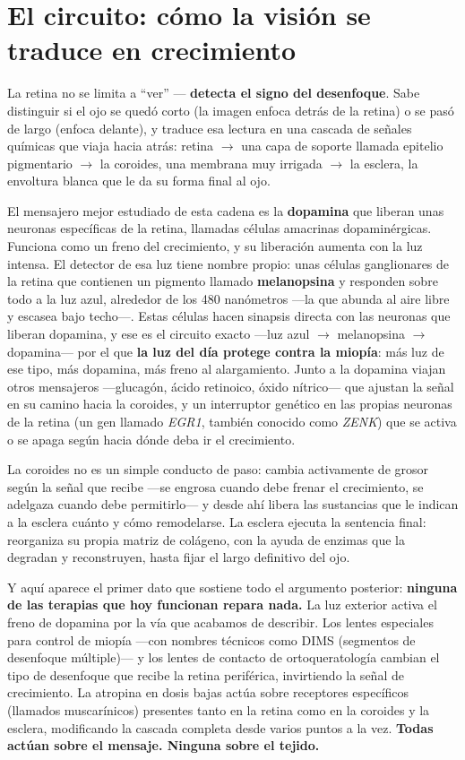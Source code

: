 \documentclass[10pt,a4paper]{article}
\providecommand{\enquote}[1]{``#1''}
\begin{document}
\section{El circuito: c\'omo la visi\'on se traduce en crecimiento}

La retina no se limita a \enquote{ver} --- \textbf{detecta el signo del desenfoque}. Sabe distinguir si el ojo se qued\'o corto (la imagen enfoca detr\'as de la retina) o se pas\'o de largo (enfoca delante), y traduce esa lectura en una cascada de se\~nales qu\'imicas que viaja hacia atr\'as: retina \(\rightarrow\) una capa de soporte llamada epitelio pigmentario \(\rightarrow\) la coroides, una membrana muy irrigada \(\rightarrow\) la esclera, la envoltura blanca que le da su forma final al ojo.

El mensajero mejor estudiado de esta cadena es la \textbf{dopamina} que liberan unas neuronas espec\'ificas de la retina, llamadas c\'elulas amacrinas dopamin\'ergicas. Funciona como un freno del crecimiento, y su liberaci\'on aumenta con la luz intensa. El detector de esa luz tiene nombre propio: unas c\'elulas ganglionares de la retina que contienen un pigmento llamado \textbf{melanopsina} y responden sobre todo a la luz azul, alrededor de los 480 nan\'ometros ---la que abunda al aire libre y escasea bajo techo---. Estas c\'elulas hacen sinapsis directa con las neuronas que liberan dopamina, y ese es el circuito exacto ---luz azul \(\rightarrow\) melanopsina \(\rightarrow\) dopamina--- por el que \textbf{la luz del d\'ia protege contra la miop\'ia}: m\'as luz de ese tipo, m\'as dopamina, m\'as freno al alargamiento. Junto a la dopamina viajan otros mensajeros ---glucag\'on, \'acido retinoico, \'oxido n\'itrico--- que ajustan la se\~nal en su camino hacia la coroides, y un interruptor gen\'etico en las propias neuronas de la retina (un gen llamado \emph{EGR1}, tambi\'en conocido como \emph{ZENK}) que se activa o se apaga seg\'un hacia d\'onde deba ir el crecimiento.

La coroides no es un simple conducto de paso: cambia activamente de grosor seg\'un la se\~nal que recibe ---se engrosa cuando debe frenar el crecimiento, se adelgaza cuando debe permitirlo--- y desde ah\'i libera las sustancias que le indican a la esclera cu\'anto y c\'omo remodelarse. La esclera ejecuta la sentencia final: reorganiza su propia matriz de col\'ageno, con la ayuda de enzimas que la degradan y reconstruyen, hasta fijar el largo definitivo del ojo.

Y aqu\'i aparece el primer dato que sostiene todo el argumento posterior: \textbf{ninguna de las terapias que hoy funcionan repara nada.} La luz exterior activa el freno de dopamina por la v\'ia que acabamos de describir. Los lentes especiales para control de miop\'ia ---con nombres t\'ecnicos como DIMS (segmentos de desenfoque m\'ultiple)--- y los lentes de contacto de ortoqueratolog\'ia cambian el tipo de desenfoque que recibe la retina perif\'erica, invirtiendo la se\~nal de crecimiento. La atropina en dosis bajas act\'ua sobre receptores espec\'ificos (llamados muscar\'inicos) presentes tanto en la retina como en la coroides y la esclera, modificando la cascada completa desde varios puntos a la vez. \textbf{Todas act\'uan sobre el mensaje. Ninguna sobre el tejido.}
\end{document}
